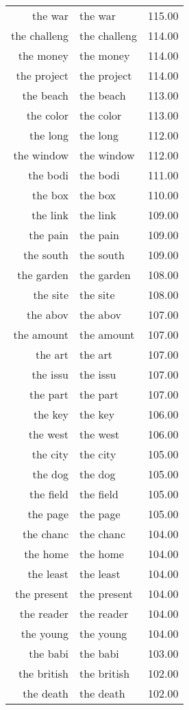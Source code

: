 \begin{table}[ht]
\begin{tabular}{rlr}
  the war & the war & 115.00 \\ 
  the challeng & the challeng & 114.00 \\ 
  the money & the money & 114.00 \\ 
  the project & the project & 114.00 \\ 
  the beach & the beach & 113.00 \\ 
  the color & the color & 113.00 \\ 
  the long & the long & 112.00 \\ 
  the window & the window & 112.00 \\ 
  the bodi & the bodi & 111.00 \\ 
  the box & the box & 110.00 \\ 
  the link & the link & 109.00 \\ 
  the pain & the pain & 109.00 \\ 
  the south & the south & 109.00 \\ 
  the garden & the garden & 108.00 \\ 
  the site & the site & 108.00 \\ 
  the abov & the abov & 107.00 \\ 
  the amount & the amount & 107.00 \\ 
  the art & the art & 107.00 \\ 
  the issu & the issu & 107.00 \\ 
  the part & the part & 107.00 \\ 
  the key & the key & 106.00 \\ 
  the west & the west & 106.00 \\ 
  the city & the city & 105.00 \\ 
  the dog & the dog & 105.00 \\ 
  the field & the field & 105.00 \\ 
  the page & the page & 105.00 \\ 
  the chanc & the chanc & 104.00 \\ 
  the home & the home & 104.00 \\ 
  the least & the least & 104.00 \\ 
  the present & the present & 104.00 \\ 
  the reader & the reader & 104.00 \\ 
  the young & the young & 104.00 \\ 
  the babi & the babi & 103.00 \\ 
  the british & the british & 102.00 \\ 
  the death & the death & 102.00 \\ 

\end{tabular}
\end{table}
